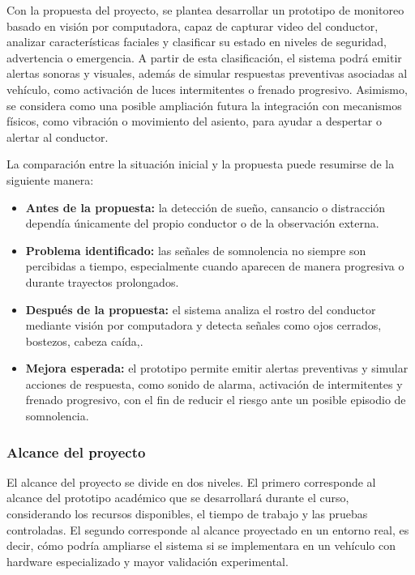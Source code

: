 \documentclass[conference]{IEEEtran}
\begin{document}
Con la propuesta del proyecto, se plantea desarrollar un prototipo de monitoreo basado en visión por computadora, capaz de capturar video del conductor, analizar características faciales y clasificar su estado en niveles de seguridad, advertencia o emergencia. A partir de esta clasificación, el sistema podrá emitir alertas sonoras y visuales, además de simular respuestas preventivas asociadas al vehículo, como activación de luces intermitentes o frenado progresivo. Asimismo, se considera como una posible ampliación futura la integración con mecanismos físicos, como vibración o movimiento del asiento, para ayudar a despertar o alertar al conductor.

La comparación entre la situación inicial y la propuesta puede resumirse de la siguiente manera:

\begin{itemize}
    \item \textbf{Antes de la propuesta:} la detección de sueño, cansancio o distracción dependía únicamente del propio conductor o de la observación externa.
    
    \item \textbf{Problema identificado:} las señales de somnolencia no siempre son percibidas a tiempo, especialmente cuando aparecen de manera progresiva o durante trayectos prolongados.
    
    \item \textbf{Después de la propuesta:} el sistema analiza el rostro del conductor mediante visión por computadora y detecta señales como ojos cerrados, bostezos, cabeza caída,.
    
    \item \textbf{Mejora esperada:} el prototipo permite emitir alertas preventivas y simular acciones de respuesta, como sonido de alarma, activación de intermitentes y frenado progresivo, con el fin de reducir el riesgo ante un posible episodio de somnolencia.
\end{itemize}

\subsubsection{Alcance del proyecto}

El alcance del proyecto se divide en dos niveles. El primero corresponde al alcance del prototipo académico que se desarrollará durante el curso, considerando los recursos disponibles, el tiempo de trabajo y las pruebas controladas. El segundo corresponde al alcance proyectado en un entorno real, es decir, cómo podría ampliarse el sistema si se implementara en un vehículo con hardware especializado y mayor validación experimental.
\end{document}
